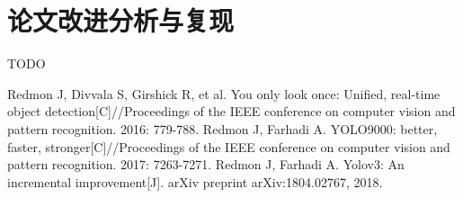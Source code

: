 \documentclass[a4paper, notitlepage]{article}
\begin{document}
\section{论文改进分析与复现}
TODO

\begin{thebibliography}{X}
Redmon J, Divvala S, Girshick R, et al. You only look once: Unified, real-time object detection[C]//Proceedings of the IEEE conference on computer vision and pattern recognition. 2016: 779-788.
Redmon J, Farhadi A. YOLO9000: better, faster, stronger[C]//Proceedings of the IEEE conference on computer vision and pattern recognition. 2017: 7263-7271. 
Redmon J, Farhadi A. Yolov3: An incremental improvement[J]. arXiv preprint arXiv:1804.02767, 2018.
\end{thebibliography}

\clearpage


\end{document}
